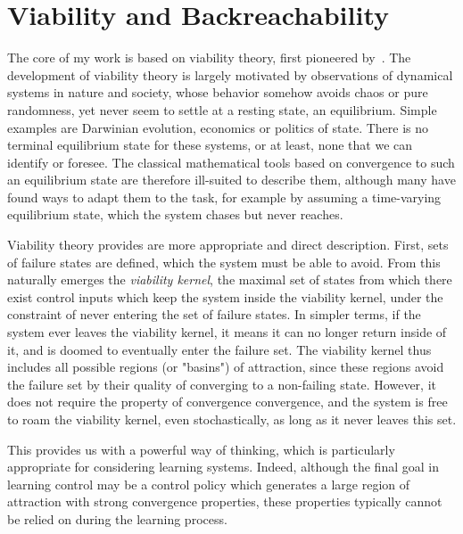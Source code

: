 \section{Viability and Backreachability}

The core of my work is based on viability theory, first pioneered by~\textcite{aubin2011viability}. The development of viability theory is largely motivated by observations of dynamical systems in nature and society, whose behavior somehow avoids chaos or pure randomness, yet never seem to settle at a resting state, an equilibrium.
Simple examples are Darwinian evolution, economics or politics of state. There is no terminal equilibrium state for these systems, or at least, none that we can identify or foresee.
The classical mathematical tools based on convergence to such an equilibrium state are therefore ill-suited to describe them, although many have found ways to adapt them to the task, for example by assuming a time-varying equilibrium state, which the system chases but never reaches. \par
Viability theory provides are more appropriate and direct description. First, sets of failure states are defined, which the system must be able to avoid. From this naturally emerges the \emph{viability kernel}, the maximal set of states from which there exist control inputs which keep the system inside the viability kernel, under the constraint of never entering the set of failure states. In simpler terms, if the system ever leaves the viability kernel, it means it can no longer return inside of it, and is doomed to eventually enter the failure set.
The viability kernel thus includes all possible regions (or "basins") of attraction, since these regions avoid the failure set by their quality of converging to a non-failing state. However, it does not require the property of convergence convergence, and the system is free to roam the viability kernel, even stochastically, as long as it never leaves this set. \par
This provides us with a powerful way of thinking, which is particularly appropriate for considering learning systems. Indeed, although the final goal in learning control may be a control policy which generates a large region of attraction with strong convergence properties, these properties typically cannot be relied on during the learning process. \par

